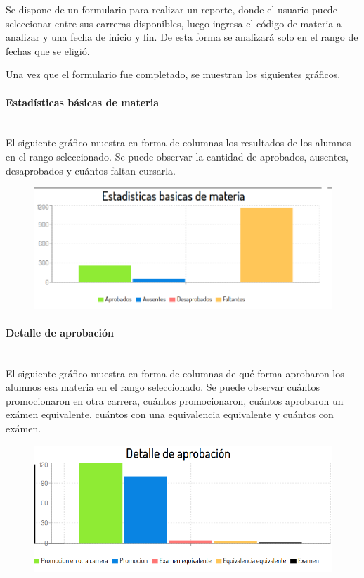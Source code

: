 Se dispone de un formulario para realizar un reporte, donde el usuario puede seleccionar entre sus carreras disponibles, luego ingresa el código de materia a analizar y una fecha de inicio y fin. De esta forma se analizará solo en el rango de fechas que se eligió.

Una vez que el formulario fue completado, se muestran los siguientes gráficos.

\paragraph{Estadísticas básicas de materia} \mbox{}\\
El siguiente gráfico muestra en forma de columnas los resultados de los alumnos en el rango seleccionado. Se puede observar la cantidad de aprobados, ausentes, desaprobados y cuántos faltan cursarla.

\begin{figure}[!htbp]
  \centering
    \includegraphics[scale=0.4]{images/seguimiento-academico/sa-datosbasicos.png}
  \label{fig:sa-datos-basico}
\end{figure}

\paragraph{Detalle de aprobación} \mbox{}\\
El siguiente gráfico muestra en forma de columnas de qué forma aprobaron los alumnos esa materia en el rango seleccionado. Se puede observar cuántos promocionaron en otra carrera, cuántos promocionaron, cuántos aprobaron un exámen equivalente, cuántos con una equivalencia equivalente y cuántos con exámen.

\begin{figure}[!htbp]
  \centering
    \includegraphics[scale=0.4]{images/seguimiento-academico/sa-detalleaprobacion.png}
  \label{fig:sa-detalle-aprobacion}
\end{figure}

